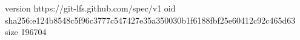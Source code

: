 version https://git-lfs.github.com/spec/v1
oid sha256:e124b8548c5f96c3777c547427e35a350030b1f6188fbf25e60412c92c465d63
size 196704
